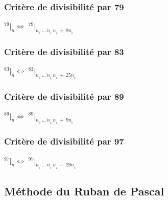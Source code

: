 \documentclass[a4paper, twoside]{article}
\begin{document}
	\vfill
	{\noindent \dotfill}



	\subsubsection*{Critère de divisibilité par 79}

	\begin{center}
		\huge
		$ ^{79}|_n \Leftrightarrow$ $^{79}|_{\overline{n_{_{k}}~\dots~n_{_2}~n_{_1}}~+~8n_{_0}} $
	\end{center}

	\bigskip

	\newpage








	\subsubsection*{Critère de divisibilité par 83}

	\begin{center}
		\huge
		$ ^{83}|_n \Leftrightarrow$ $^{83}|_{\overline{n_{_{k}}~\dots~n_{_2}~n_{_1}}~+~25n_{_0}} $
	\end{center}

	\bigskip
	{\noindent \dotfill}

	\subsubsection*{Critère de divisibilité par 89}

	\begin{center}
		\huge
		$ ^{89}|_n \Leftrightarrow$ $^{89}|_{\overline{n_{_{k}}~\dots~n_{_2}~n_{_1}}~+~9n_{_0}} $
	\end{center}

	\bigskip
	{\noindent \dotfill}

	\subsubsection*{Critère de divisibilité par 97}

	\begin{center}
		\huge
		$ ^{97}|_n \Leftrightarrow$ $^{97}|_{\overline{n_{_{k}}~\dots~n_{_2}~n_{_1}}~-~29n_{_0}} $
	\end{center}

	\bigskip \bigskip 

	\subsection{Méthode du Ruban de Pascal} \label{section_ruban_pascal}
	\let\thefootnote\relax{}
\end{document}
